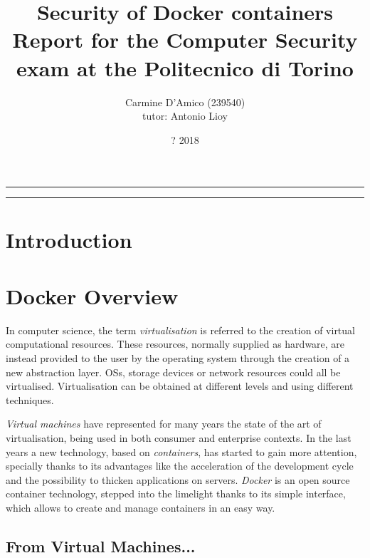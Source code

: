 \documentclass[a4paper,12pt]{article}
\begin{document}
\title{Security of Docker containers \\
{\normalsize Report for the Computer Security exam at the Politecnico di Torino}
} \author{Carmine D'Amico (239540) \\
{\normalsize tutor: Antonio Lioy} }
\date{? 2018}
\maketitle

\vfill

\rule{\textwidth}{1pt}

\tableofcontents

\rule{\textwidth}{1pt}

\vfill

\newpage

\section{Introduction}

\newpage

\section{Docker Overview}

In computer science, the term \textit{virtualisation} is referred to the
creation of virtual computational resources\cite{wikipedia_virtualization}.
These resources, normally supplied as hardware, are instead provided to the user
by the operating system through the creation of a new abstraction layer. OSs,
storage devices or network resources could all be virtualised. Virtualisation
can be obtained at different levels and using different techniques.
\par\textit{Virtual machines} have represented for many years the state of the
art of virtualisation, being used in both consumer and enterprise contexts. In
the last years a new technology, based on \textit{containers}, has started to
gain more attention, specially thanks to its advantages like the acceleration of
the development cycle and the possibility to thicken applications on servers.
\textit{Docker} is an open source container technology, stepped into the
limelight thanks to its simple interface, which allows to create and manage
containers in an easy way. 

\subsection{From Virtual Machines...}
\end{document}
